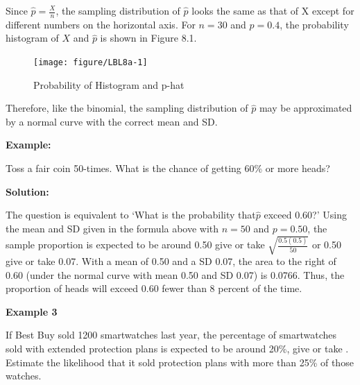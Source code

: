 \documentclass[11pt, chapterprefix=true]{scrbook}\usepackage[]{graphicx}\usepackage[]{color}
\begin{document}
Since $\hat{p} = \frac{X}{n}$, the sampling distribution of $\hat{p}$ looks the same as that of X except for different numbers on the horizontal axis.  For $n = 30$ and $p = 0.4$, the probability histogram of $X$ and $\hat{p}$ is shown in Figure 8.1.

\begin{figure}[ht]

\caption{Probability of Histogram and p-hat}



{\centering \texttt{[image: figure/LBL8a-1]} 

}



\end{figure}

Therefore, like the binomial, the sampling distribution of $\hat{p}$ may be approximated by a normal curve with the correct mean and SD.

\begin{minipage}[ht]{3cm}


\textbf{Example:}
\end{minipage}
\begin{minipage}[ht]{11cm}

\parbox{11cm}{Toss a fair coin 50-times.  What is the chance of getting 60\% or more heads?
}
\end{minipage}

\begin{minipage}[ht]{3cm}

\vspace{-28mm}

\textbf{Solution:}
\end{minipage}
\begin{minipage}[ht]{11cm}

\parbox{11cm}{
The question is equivalent to `What is the probability that$\hat{p}$ exceed 0.60?'  Using the mean and SD given in the formula above with $n = 50$ and $p = 0.50$, the sample proportion is expected to be around 0.50 give or take $\sqrt{\frac{0.5 (0.5)}{50}}$ or 0.50 give or take 0.07.  With a mean of 0.50 and a SD 0.07, the area to the right of 0.60 (under the normal curve with mean 0.50 and SD 0.07) is 0.0766.  Thus, the proportion of heads will exceed 0.60 fewer than 8 percent of the time.

}
\end{minipage}

\begin{minipage}[ht]{3cm}

\vspace{-14mm}

\textbf{Example 3}
\end{minipage}
\begin{minipage}[ht]{11cm}

\parbox{11cm}{
If Best Buy sold 1200 smartwatches last year, the percentage of smartwatches sold with extended protection plans is expected to be around 20\%, give or take \underline{\phantom{xxxxxx}}.  Estimate the likelihood that it sold protection plans with more than 25\% of those watches.
}
\end{minipage}
\end{document}
